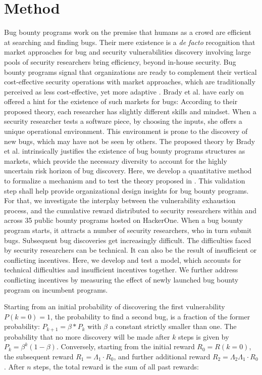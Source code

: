 \section{Method}
\label{sec:method}
Bug bounty programs work on the premise that humans as a crowd are efficient at searching and finding bugs. Their mere existence is a {\it de facto} recognition that market approaches for bug and security vulnerabilities discovery involving large pools of security researchers bring efficiency, beyond in-house security. Bug bounty programs signal that organizations are ready to complement their vertical cost-effective security operations with market approaches, which are traditionally perceived as less cost-effective, yet more adaptive \cite{coase1937}. Brady et al. \cite{brady1999murphy} have early on offered a hint for the existence of such markets for bugs: According to their proposed theory, each researcher has slightly different skills and mindset. When a security researcher tests a software piece, by choosing the inputs, she offers a unique operational environment. This environment is prone to the discovery of new bugs, which may have not be seen by others. The proposed theory by Brady et al. \cite{brady1999murphy} intrinsically justifies the existence of bug bounty programs structures as markets, which provide the necessary diversity to account for the highly uncertain risk horizon of bug discovery. Here, we develop a quantitative method to formalize a mechanism and to test the theory proposed in \cite{brady1999murphy}. This validation step shall help provide organizational design insights for bug bounty programs.\\

For that, we investigate the interplay between the vulnerability exhaustion process, and the cumulative reward distributed to security researchers within and across 35 public bounty programs hosted on HackerOne. When a bug bounty program starts, it attracts a number of security researchers, who in turn submit bugs. Subsequent bug discoveries get increasingly difficult. The difficulties faced by security researchers can be technical. It can also be the result of insufficient or conflicting incentives. Here, we develop and test a model, which accounts for technical difficulties and insufficient incentives together. We further address conflicting incentives by measuring the effect of newly launched bug bounty program on incumbent programs.

Starting from an initial probability of discovering the first vulnerability $P(k=0) = 1$, the probability to find a second bug, is a fraction of the former probability: $P_{k+1} = \beta * P_k$ with $\beta$ a constant strictly smaller than one. The probability that no more discovery will be made after $k$ steps is given by $P_k = \beta^{k} (1-\beta)$. Conversely, starting from the initial reward $R_0 = R(k=0)$, the subsequent reward $R_1 = \Lambda_1 \cdot R_0$, and further additional reward $ R_2 = \Lambda_2 \Lambda_1 \cdot R_{0}$. After $n$ steps, the total reward is the sum of all past rewards: 

